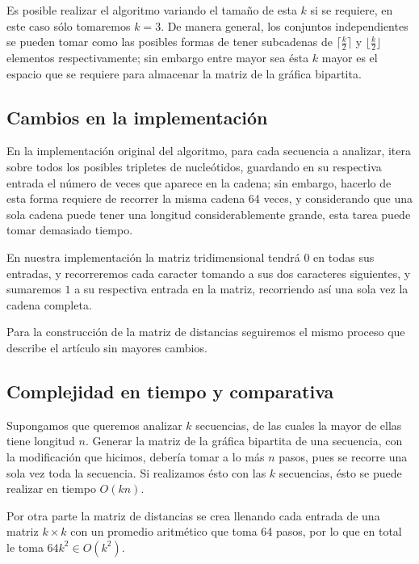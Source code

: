 \documentclass[12pt]{article}
\begin{document}
Es posible realizar el algoritmo variando el tamaño de esta $k$ si se requiere, en este caso sólo tomaremos $k=3$. De manera general, los conjuntos independientes se pueden tomar como las posibles formas de tener subcadenas de $\lceil\frac{k}{2}\rceil$ y $\lfloor\frac{k}{2}\rfloor$ elementos respectivamente; sin embargo entre mayor sea ésta $k$ mayor es el espacio que se requiere para almacenar la matriz de la gráfica bipartita.

\subsection{Cambios en la implementación}

\noindent En la implementación original del algoritmo, para cada secuencia a analizar, itera sobre todos los posibles tripletes de nucleótidos, guardando en su respectiva entrada el número de veces que aparece en la cadena; sin embargo, hacerlo de esta forma requiere de recorrer la misma cadena 64 veces, y considerando que una sola cadena puede tener una longitud considerablemente grande, esta tarea puede tomar demasiado tiempo.

En nuestra implementación la matriz tridimensional tendrá $0$ en todas sus entradas, y recorreremos cada caracter tomando a sus dos caracteres siguientes, y sumaremos $1$ a su respectiva entrada en la matriz, recorriendo así una sola vez la cadena completa.

Para la construcción de la matriz de distancias seguiremos el mismo proceso que describe el artículo sin mayores cambios.

\subsection{Complejidad en tiempo y comparativa}

\noindent Supongamos que queremos analizar $k$ secuencias, de las cuales la mayor de ellas tiene longitud $n$. Generar la matriz de la gráfica bipartita de una secuencia, con la modificación que hicimos, debería tomar a lo más $n$ pasos, pues se recorre una sola vez toda la secuencia. Si realizamos ésto con las $k$ secuencias, ésto se puede realizar en tiempo $O(kn)$.

Por otra parte la matriz de distancias se crea llenando cada entrada de una matriz $k\times k$ con un promedio aritmético que toma 64 pasos, por lo que en total le toma $64k^2\in O(k^2)$.
\end{document}
